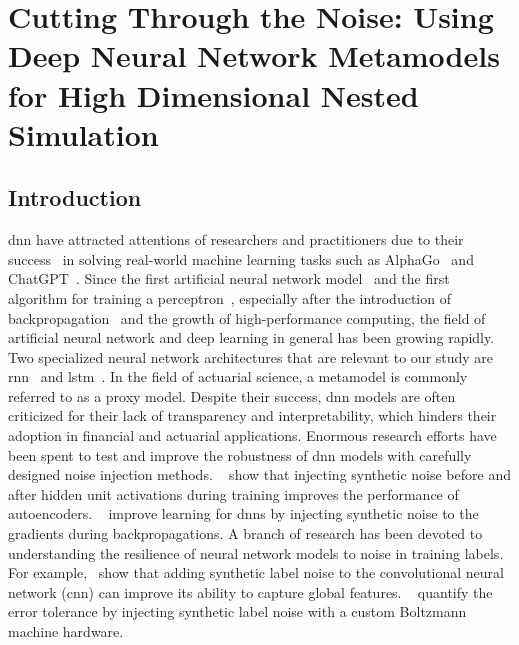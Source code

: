 \chapter{Cutting Through the Noise: Using Deep Neural Network Metamodels for High Dimensional Nested Simulation}
\label{chap:project2}


\section{Introduction}

\gls{dnn} have attracted attentions of researchers and practitioners due to their success~\citep{hastie2009elements,lecun2015deep} in solving real-world machine learning tasks such as AlphaGo~\citep{silver2016mastering} and ChatGPT~\citep{chatgpt}.
Since the first artificial neural network model~\citep{mcculloch1943logical} and the first algorithm for training a perceptron~\citep{rosenblatt1958perceptron}, especially after the introduction of backpropagation~\citep{rumelhart1985learning} and the growth of high-performance computing, the field of artificial neural network and deep learning in general has been growing rapidly.
Two specialized neural network architectures that are relevant to our study are \gls{rnn}~\citep{williams1989learning,sutskever2014sequence} and \gls{lstm}~\citep{hochreiter1997long,chung2014empirical}.
In the field of actuarial science, a metamodel is commonly referred to as a proxy model.
Despite their success, \gls{dnn} models are often criticized for their lack of transparency and interpretability, which hinders their adoption in financial and actuarial applications.
Enormous research efforts have been spent to test and improve the robustness of \gls{dnn} models with carefully designed noise injection methods.
~\cite{poole2014analyzing} show that injecting synthetic noise before and after hidden unit activations during training improves the performance of autoencoders.
~\cite{neelakantan2015adding} improve learning for \gls{dnn}s by injecting synthetic noise to the gradients during backpropagations.
A branch of research has been devoted to understanding the resilience of neural network models to noise in training labels.
For example,~\cite{luo2016understanding} show that adding synthetic label noise to the convolutional neural network (\gls{cnn}) can improve its ability to capture global features. 
~\cite{srivastava2014dropout} quantify the error tolerance by injecting synthetic label noise with a custom Boltzmann machine hardware.
